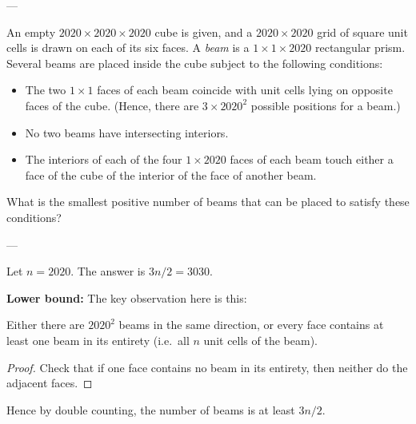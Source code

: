 
---

An empty $2020\times2020\times2020$ cube is given, and a $2020\times2020$ grid of square unit cells is drawn on each of its six faces. A \emph{beam} is a $1\times1\times2020$ rectangular prism. Several beams are placed inside the cube subject to the following conditions:
\begin{itemize}
    \item The two $1\times1$ faces of each beam coincide with unit cells lying on opposite faces of the cube. (Hence, there are $3\times2020^2$ possible positions for a beam.)
    \item No two beams have intersecting interiors.
    \item The interiors of each of the four $1\times2020$ faces of each beam touch either a face of the cube of the interior of the face of another beam.
\end{itemize}
What is the smallest positive number of beams that can be placed to satisfy these conditions?

---

Let $n=2020$. The answer is $3n/2=3030$.

\bigskip

\textbf{Lower bound:} The key observation here is this:
\begin{claim*}
    Either there are $2020^2$ beams in the same direction, or every face contains at least one beam in its entirety (i.e.\ all $n$ unit cells of the beam).
\end{claim*}
\begin{proof}
    Check that if one face contains no beam in its entirety, then neither do the adjacent faces.
\end{proof}

Hence by double counting, the number of beams is at least $3n/2$.

\bigskip

